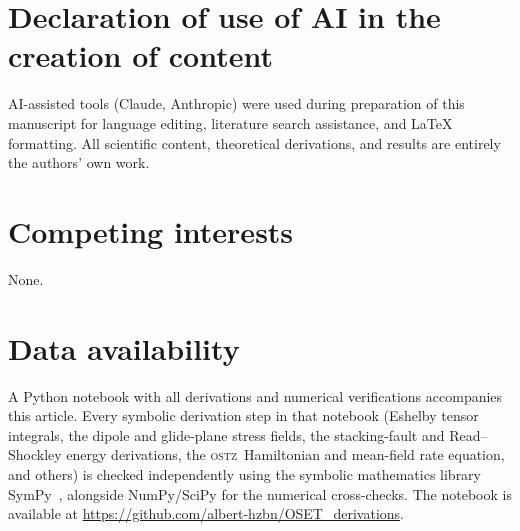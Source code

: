 \documentclass[3p]{elsarticle}
\newcommand{\OSTZ}{\textsc{ostz}}
\begin{document}
\section*{Declaration of use of AI in the creation of content}
AI-assisted tools (Claude, Anthropic) were used during preparation of
this manuscript for language editing, literature search assistance, and
LaTeX formatting. All scientific content, theoretical derivations, and
results are entirely the authors' own work.

\section*{Competing interests}
None.

\section*{Data availability}
A Python notebook with all derivations and numerical verifications
accompanies this article. Every symbolic derivation step in that
notebook (Eshelby tensor integrals, the dipole and glide-plane stress
fields, the stacking-fault and Read--Shockley energy derivations, the
\OSTZ\ Hamiltonian and mean-field rate equation, and others) is
checked independently using the symbolic mathematics library
SymPy~\citep{meurer2017sympy}, alongside NumPy/SciPy for the numerical
cross-checks. The notebook is available at
\url{https://github.com/albert-hzbn/OSET_derivations}.



\end{document}
